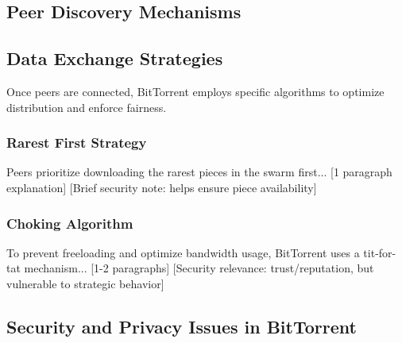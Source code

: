\subsection{Peer Discovery Mechanisms}
\label{peer_discovery}

\subsection{Data Exchange Strategies}
\label{data_exchange}

Once peers are connected, BitTorrent employs specific algorithms to
optimize distribution and enforce fairness.

\subsubsection{Rarest First Strategy}

Peers prioritize downloading the rarest pieces in the swarm first...
[1 paragraph explanation]
[Brief security note: helps ensure piece availability]

\subsubsection{Choking Algorithm}

To prevent freeloading and optimize bandwidth usage, BitTorrent uses a
tit-for-tat mechanism...
[1-2 paragraphs]
[Security relevance: trust/reputation, but vulnerable to strategic behavior]



\subsection{Security and Privacy Issues in BitTorrent}
\label{issues_bittorrent}


